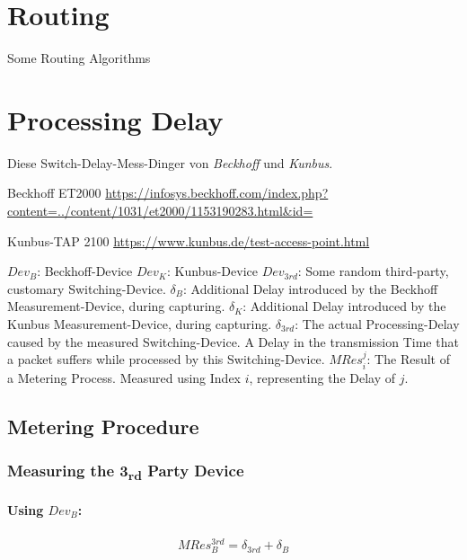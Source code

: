 \section{Routing}
Some Routing Algorithms








\section{Processing Delay}

Diese Switch-Delay-Mess-Dinger von \textit{Beckhoff} und \textit{Kunbus}.\nl%

Beckhoff ET2000\nl%
\url{https://infosys.beckhoff.com/index.php?content=../content/1031/et2000/1153190283.html&id=}\nl%

Kunbus-TAP 2100\nl%
\url{https://www.kunbus.de/test-access-point.html}%

\npi%
$Dev_B$: Beckhoff-Device\nl%
$Dev_K$: Kunbus-Device\nl%
$Dev_{3rd}$: Some random third-party, customary Switching-Device.%
\npi%
$\delta_B$: Additional Delay introduced by the Beckhoff Measurement-Device, during capturing.\nl%
$\delta_K$: Additional Delay introduced by the Kunbus Measurement-Device, during capturing.\nl%
$\delta_{3rd}$: The actual Processing-Delay caused by the measured Switching-Device. A Delay in the transmission Time that a packet suffers while processed by this Switching-Device.
\npi%
$MRes_i^j$: The Result of a Metering Process. Measured using Index $i$, representing the Delay of $j$.

\subsection{Metering Procedure}

\subsubsection{Measuring the \mbox{3\textsubscript{rd}} Party Device}

\paragraph{Using $Dev_B$:}
\begin{equation}\begin{split}
\label{eq:MRes3B}
MRes_{B}^{3rd} = \delta_{3rd} + \delta_{B}
\end{split}\end{equation}

